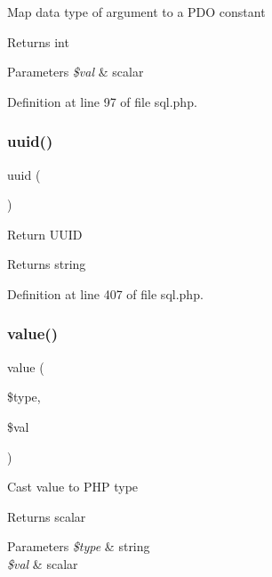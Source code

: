 Map data type of argument to a P\+DO constant \begin{DoxyReturn}{Returns}
int 
\end{DoxyReturn}

\begin{DoxyParams}{Parameters}
{\em \$val} & scalar \\
\hline
\end{DoxyParams}


Definition at line 97 of file sql.\+php.

\hypertarget{class_d_b_1_1_s_q_l_a0a684acda95e124d8596758e4986fe44}{}\label{class_d_b_1_1_s_q_l_a0a684acda95e124d8596758e4986fe44} 
\subsubsection{\texorpdfstring{uuid()}{uuid()}}
{\footnotesize\ttfamily uuid (\begin{DoxyParamCaption}{ }\end{DoxyParamCaption})}

Return U\+U\+ID \begin{DoxyReturn}{Returns}
string 
\end{DoxyReturn}


Definition at line 407 of file sql.\+php.

\hypertarget{class_d_b_1_1_s_q_l_a2f2c81ec59416b46db04db19ac4f8e1c}{}\label{class_d_b_1_1_s_q_l_a2f2c81ec59416b46db04db19ac4f8e1c} 
\subsubsection{\texorpdfstring{value()}{value()}}
{\footnotesize\ttfamily value (\begin{DoxyParamCaption}\item[{}]{\$type,  }\item[{}]{\$val }\end{DoxyParamCaption})}

Cast value to P\+HP type \begin{DoxyReturn}{Returns}
scalar 
\end{DoxyReturn}

\begin{DoxyParams}{Parameters}
{\em \$type} & string \\
\hline
{\em \$val} & scalar \\
\hline
\end{DoxyParams}


